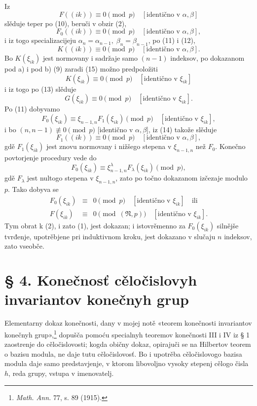 \documentclass[11pt]{article}
\providecommand{\frN}{\mathfrak N}
\begin{document}
Iz
\[
        F((ik))\equiv0\pmod p\quad [\text{identično v \(\alpha,\beta\)}]
\]
slěduje teper po (10), beruči v obzir (2),
\begin{equation}
        F_0((ik))\equiv0\pmod p\quad [\text{identično v \(\alpha,\beta\)}],
\end{equation}
i iz togo specializacijeju \(\alpha_n=\alpha_{n-1},\;\beta_n=\beta_{n-1}\), po (11) i (12),
\begin{equation}
        K((ik))\equiv0\pmod p\quad [\text{identično v \(\alpha,\beta\)}].
\end{equation}
Bo \(K(\xi_{ik})\) jest normovany i sadržaje samo \((n-1)\) indeksov, po dokazanom pod a) i pod b) (9) zaradi (15) možno predpoložiti
\[
        K(\xi_{ik})\equiv0\pmod p\quad [\text{identično v \(\xi_{ik}\)}]
\]
i iz togo po (13) slěduje
\[
        G(\xi_{ik})\equiv0\pmod p\quad [\text{identično v \(\xi_{ik}\)}].
\]
Po (11) dobyvamo
\[
        F_0(\xi_{ik})\equiv\xi_{n-1,n}F_1(\xi_{ik})\pmod p\quad [\text{identično v \(\xi_{ik}\)}],
\]
i bo \((n,n-1)\not\equiv0\pmod p\) [identično v \(\alpha,\beta\)], iz (14) takože slěduje
\[
        F_1((ik))\equiv0\pmod p\quad [\text{identično v \(\alpha,\beta\)}],
\]
gdě \(F_1(\xi_{ik})\) jest znovu normovany i nižšego stepena v \(\xi_{n-1,n}\) než \(F_0\). Konečno povtorjenje procedury vede do
\[
        F_0(\xi_{ik})\equiv\xi_{n-1,n}^{\lambda}F_\lambda(\xi_{ik})\pmod p,
\]
gdě \(F_\lambda\) jest nultogo stepena v \(\xi_{n-1,n}\), zato po točno dokazanom izčezaje modulo \(p\). Tako dobyva se
\begin{equation}
\begin{array}{rcl}
        F_0(\xi_{ik})&\equiv&0\pmod p\quad [\text{identično v \(\xi_{ik}\)}]\quad \text{ili}\\
        F(\xi_{ik})&\equiv&0\pmod{(\frN,p)}\quad [\text{identično v \(\xi_{ik}\)}].
\end{array}
\end{equation}
Tym obrat k (2), i zato (1), jest dokazan; i istovrěmenno za \(F_0(\xi_{ik})\) silnějše tvrđenje, upotrěbjene pri induktivnom kroku, jest dokazano v slučaju \(n\) indeksov, zato vseobče.

\setcounter{equation}{0}
\section*{§ 4. Konečnosť cěločislovyh invariantov konečnyh grup}

Elementarny dokaz konečnosti, dany v mojej notě «teorem konečnosti invariantov konečnyh grup»,\footnote{\emph{Math. Ann.} 77, s. 89 (1915).} dopušča pomoću specialnyh teoremov konečnosti III i IV iz § 1 zaostrenje do cěločislovosti; kogda običny dokaz, opirajuči se na Hilbertov teorem o bazisu modula, ne daje tutu cěločislovosť. Bo i upotrěba cěločislovogo bazisa modula daje samo predstavjenje, v ktorom libovoljno vysoky stepenj cělogo čisla \(h\), reda grupy, vstupa v imenovatelj.
\end{document}
